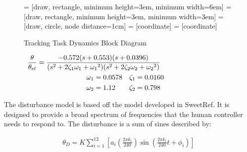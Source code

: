 \begin{figure}
    \centering
     = [draw, rectangle, minimum height=3em, minimum width=6em]
     = [draw, rectangle, minimum height=3em, minimum width=3em]
     = [draw, circle, node distance=1cm]
     = [coordinate]
     = [coordinate]
    \caption{Tracking Task Dynamics Block Diagram}
    \label{fig:de_block_diagram}
\end{figure}

\begin{align}
    \mathclap{ %
        \frac{\theta}{\theta_{el}}
        =
        \frac{
            -0.572 (s+0.553) (s+0.0396)
        }{
            (s^2 + 2\zeta_1 \omega_1 + {\omega_1}^2)
            (s^2 + 2\zeta_2 \omega_2 + {\omega_2}^2)
        }
    }\\
    \omega_1 &= 0.0578 & \zeta_1 &= 0.0160 \nonumber \\
    \omega_2 &= 1.12 & \zeta_2 &= 0.798 \nonumber
\end{align}

The disturbance model is based off the model developed in SweetRef\cite{sweet}.
It is designed to provide a broad spectrum of frequencies that the human controller needs to respond to.
The disturbance is a sum of sines described by:

\begin{align}
    \theta_D = K\sum\limits_{i=1}^{12} \left[ a_i \left(\frac{2\pi k_i}{240} \right) \sin\left( \frac{2\pi k_i}{240}t + \phi_i \right) \right]
\end{align}

